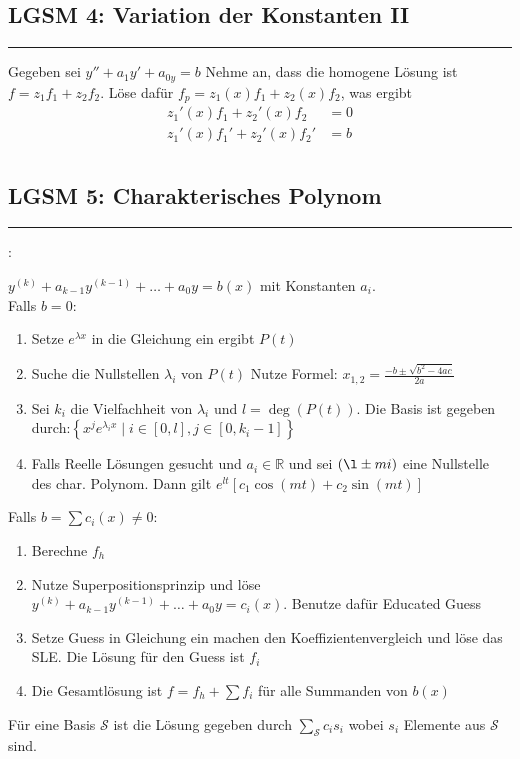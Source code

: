 \documentclass[7pt,landscape, margin = 0.1mm]{article}
\newcommand*{\mysubsection}[1]{\vspace{-2mm}\color{chaptercolor}\subsection{ #1 }
\vspace{-1mm}\hrule\vspace{1.5mm}\color{black}
\vspace{2mm}}
\newcommand{\KRZ}[2]{\vspace{1mm} \hline \vspace{1mm} \color{chaptercolor}{RC #1}:\color{black} \   \hspace{0.2cm}\vspace{1mm}   {\begin{minipage}{20em}
#2 \end{minipage}} \vspace{1mm}  \hline \vspace{1mm}  \\}
\begin{document}
\begin{multicols}{4}
\begin{flushleft}
{}

\mysubsection{LGSM 4: Variation der Konstanten II}
Gegeben sei $y'' + a_1y'+a_{0y}=  b$
Nehme an, dass die homogene Lösung ist $f = z_1 f_1 + z_2 f_2$. Löse dafür $f_p = z_1(x) f_1 + z_2(x) f_2$, was ergibt
\begin{align*}
 z_1'(x) f_1 + z_2'(x) f_2   & = 0 \\
 z_1'(x) f_1' + z_2'(x) f_2' & = b \\
 \end{align*}



\mysubsection{LGSM 5: Charakterisches Polynom}

\KRZ{Charakterisches Polynom}{
$y^{(k)}+a_{k-1}y^{(k-1)}+\ldots +a_{0}y=b(x) $ mit Konstanten  $a_{i}$.\\
Falls $b=0$:\\
\begin{enumerate}
\item Setze $e^{\lambda x}$ in die Gleichung ein ergibt $P(t)$
\item Suche die Nullstellen $\lambda_i$ von $P(t)$ Nutze Formel: $x_{1,2}=\frac{-b \pm \sqrt{b^2-4 a c}}{2 a}$


\item Sei $k_i$  die Vielfachheit von $\lambda_i$ und $l=\operatorname{deg}(P(t))$. Die Basis ist gegeben durch:$\left\{x^{j}e^{\lambda_{i}x} \mid i \in [0,l], j \in [0,k_{i}-1] \right\}$
\item Falls Reelle Lösungen gesucht und $a_i\in \mathbb{R}$ und sei $(\l \pm m i)$ eine Nullstelle des char. Polynom. Dann gilt
$e^{lt} \left[ c_1 \cos (mt)+c_2 \sin (mt) \right] $


\end{enumerate}

Falls $b=\sum c_{i}(x)\neq 0$:\\
\begin{enumerate}
\item Berechne $f_h$
\item Nutze Superpositionsprinzip und löse $y^{(k)}+a_{k-1}y^{(k-1)}+\ldots +a_{0}y=c_{i}(x)$. Benutze dafür Educated Guess 
\item Setze Guess in Gleichung ein machen den Koeffizientenvergleich und löse das SLE. Die Lösung für den Guess ist $f_i$
\item Die Gesamtlösung ist $f=f_h + \sum f_i$ für alle Summanden von $b(x)$
\end{enumerate}


Für eine Basis $\mathcal{S}$ ist die Lösung gegeben durch $\sum_{\mathcal{S}} c_i s_i$ wobei $s_i$ Elemente aus $\mathcal{S}$ sind.


}
\end{flushleft}
\end{multicols}
\end{document}
